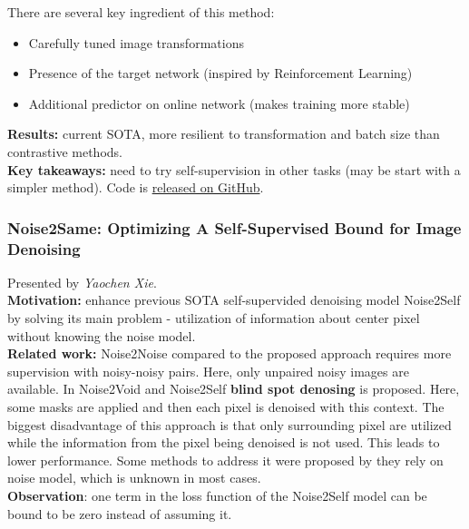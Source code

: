 There are several key ingredient of this method:
\begin{itemize}
    \item Carefully tuned image transformations
    \item Presence of the target network (inspired by Reinforcement Learning)
    \item Additional predictor on online network (makes training more stable)
\end{itemize} 

{\bf Results:} current SOTA, more resilient to transformation and batch size than contrastive methods. \\

{\bf Key takeaways:} need to try self-supervision in other tasks (may be start with a simpler method). Code is \href{https://github.com/lucidrains/byol-pytorch}{released on GitHub}. \\



\subsubsection{Noise2Same: Optimizing A Self-Supervised Bound for Image Denoising \cite{XieWJ20}}

Presented by \textit{Yaochen Xie}.  \\

{\bf Motivation:} enhance previous SOTA self-supervided denoising model Noise2Self \cite{BatsonR19} by solving its main problem - utilization of information about center pixel without knowing the noise model. \\

{\bf Related work:} Noise2Noise \cite{LehtinenMHLKAA18} compared to the proposed approach requires more supervision with noisy-noisy pairs. Here, only unpaired noisy images are available. In Noise2Void \cite{KrullBJ19} and Noise2Self \cite{BatsonR19} \textbf{blind spot denosing} is proposed. Here, some masks are applied and then each pixel is denoised with this context. The biggest disadvantage of this approach is that only surrounding pixel are utilized while the information from the pixel being denoised is not used. This leads to lower performance. Some methods to address it were proposed by they rely on noise model, which is unknown in most cases. \\

{\bf Observation}: one term in the loss function of the Noise2Self model can be bound to be zero instead of assuming it. \\

